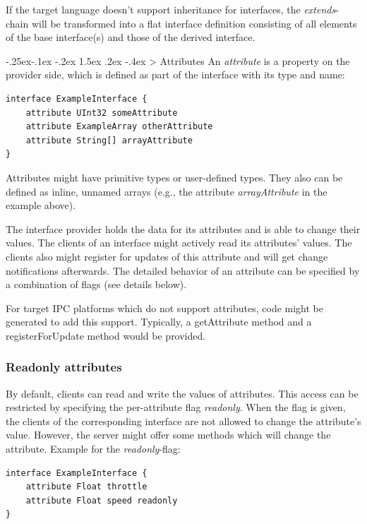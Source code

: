 \documentclass[a4paper,10pt]{scrreprt}
\makeatletter
\renewcommand\subsection{\medskip\@startsection{subsection}{2}{\z@}%
  {-.25ex\@plus -.1ex \@minus -.2ex}%
  {1.5ex \@plus .2ex \@minus -.4ex}%
  {\ifnum \scr@compatibility>\@nameuse{scr@v@2.96}\relax
    \setlength{\parfillskip}{\z@ plus 1fil}\fi
    \raggedsection\normalfont\sectfont\nobreak\size@subsection
  }%
}
\makeatother
\begin{document}
If the target language doesn't support inheritance for interfaces, the \textit{extends}-chain
will be transformed into a flat interface definition consisting of all elements of the base
interface(s) and those of the derived interface.

\subsection{Attributes}
\label{FIDL_Interface_Attribute}
An \textit{attribute} is a property on the provider side, which is defined as part of the interface
with its type and name:


\begin{lstlisting}[language=Franca]
interface ExampleInterface {
	attribute UInt32 someAttribute
	attribute ExampleArray otherAttribute
	attribute String[] arrayAttribute
}
\end{lstlisting}

Attributes might have primitive types or user-defined types. They also can be defined
as inline, unnamed arrays (e.g., the attribute \textit{arrayAttribute} in the example above). 

The interface provider holds the data for its attributes and is able to change their values.
The clients of an interface might actively read its attributes' values.
The clients also might register for updates of this attribute and will get change
notifications afterwards. The detailed behavior of an attribute can be specified
by a combination of flags (see details below). 

For target IPC platforms which do not support attributes, code might be generated to add
this support. Typically, a getAttribute method and a registerForUpdate method would be provided.

\subsubsection{Readonly attributes}
\label{FIDL_Interface_Attribute_Readonly}
By default, clients can read and write the values of attributes. This access can
be restricted by specifying the per-attribute flag \textit{readonly}. When the flag is given,
the clients of the corresponding interface are not allowed to change the attribute's
value. However, the server might offer some methods which will change the attribute.
Example for the \textit{readonly}-flag:


\begin{lstlisting}[language=Franca]
interface ExampleInterface {
	attribute Float throttle
	attribute Float speed readonly
}
\end{lstlisting}
\end{document}
